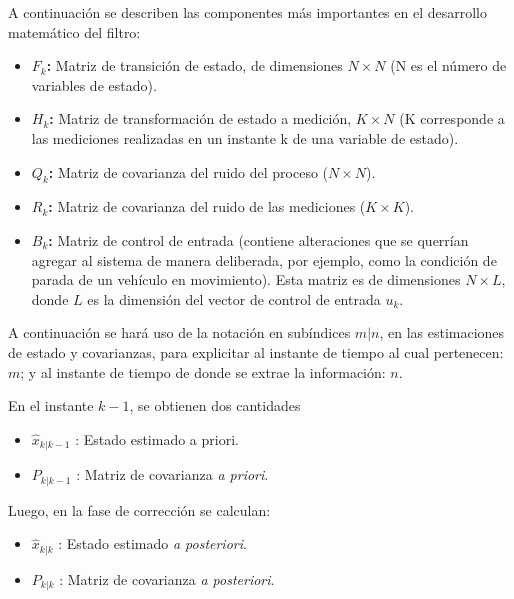 A continuaci\'on se describen las componentes m\'as importantes en el desarrollo matem\'atico del filtro:

\begin{itemize}
\item \textbf{$F_k$:} Matriz de transici\'on de estado, de dimensiones $N\times N$ (N es el n\'umero de variables de estado).
\item \textbf{$H_k$:} Matriz de transformaci\'on de estado a medici\'on, $K\times N$ (K corresponde a las mediciones realizadas en un instante k de una variable de estado).
\item \textbf{$Q_k$:} Matriz de covarianza del ruido del proceso ($N\times N$).
\item \textbf{$R_k$:} Matriz de covarianza del ruido de las mediciones ($K\times K$).
\item \textbf{$B_k$:} Matriz de control de entrada (contiene alteraciones que se querr\'ian agregar al sistema de manera deliberada, por ejemplo, como la condici\'on de parada de un veh\'iculo en movimiento). Esta matriz es de dimensiones $N\times L$, donde $L$ es la dimensi\'on del vector de control de entrada $u_k$.
\end{itemize}
\bigskip
A continuaci\'on se har\'a uso de la notaci\'on en sub\'indices $m|n$, en las estimaciones de estado y covarianzas, para explicitar al instante de tiempo al cual pertenecen:  $m$; y al instante de tiempo de donde se extrae la informaci\'on: $n$.
\bigskip

En el instante $k-1$, se obtienen dos cantidades 
\begin{itemize}
\item $\hat{x}_{k|k-1}$ : Estado estimado a priori.
\item $P_{k|k-1}$ : Matriz de covarianza \textit{a priori}.
\end{itemize}
\bigskip

Luego, en la fase de correcci\'on se calculan:

\begin{itemize}
\item $\hat{x}_{k|k}$ : Estado estimado \textit{a posteriori}.
\item $P_{k|k}$ : Matriz de covarianza \textit{a posteriori}.
\end{itemize}
\bigskip

